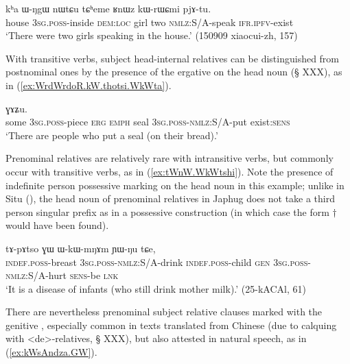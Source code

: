 \begin{exe}
\ex \label{ex:tCheme.RnWz.kWrWCmi}
 \gll  kʰa ɯ-ŋgɯ nɯtɕu tɕʰeme ʁnɯz kɯ-rɯɕmi pjɤ-tu. \\
 house \textsc{3sg}.\textsc{poss}-inside \textsc{dem}:\textsc{loc} girl two \textsc{nmlz}:S/A-speak \textsc{ifr}.\textsc{ipfv}-exist \\
\glt  `There were two girls speaking in the house.' (150909 xiaocui-zh, 157)
\end{exe}

With transitive verbs, subject head-internal relatives can be distinguished from postnominal ones  by the presence of the ergative  on the head noun (§ XXX), as in (\ref{ex:WrdWrdoR.kW.thotsi.WkWta}).

\begin{exe}
\ex \label{ex:WrdWrdoR.kW.thotsi.WkWta}
  ɣɤʑu. \\
 some \textsc{3sg}.\textsc{poss}-piece \textsc{erg} \textsc{emph} seal \textsc{3sg}.\textsc{poss}-\textsc{nmlz}:S/A-put exist:\textsc{sens} \\
 \glt `There are people who put a seal (on their bread).'
\end{exe}


Prenominal relatives are relatively rare with intransitive verbs, but commonly occur with transitive verbs, as in (\ref{ex:tWnW.WkWtshi}). Note the presence of indefinite person possessive marking on the head noun  in this example; unlike in Situ (\citealt{jacksonlin07}), the head noun of prenominal relatives in Japhug does not take a third person singular prefix as in a possessive construction (in which case the form $\dagger$ would have been found).

\begin{exe}
\ex \label{ex:tWnW.WkWtshi}
 \gll  [tɯ-nɯ ɯ-kɯ-tsʰi] tɤ-pɤtso ɣɯ ɯ-kɯ-mŋɤm ɲɯ-ŋu tɕe, \\
 \textsc{indef}.\textsc{poss}-breast \textsc{3sg}.\textsc{poss}-\textsc{nmlz}:S/A-drink \textsc{indef}.\textsc{poss}-child \textsc{gen} \textsc{3sg}.\textsc{poss}-\textsc{nmlz}:S/A-hurt \textsc{sens}-be \textsc{lnk} \\
 \glt `It is a disease of infants (who still drink mother milk).' (25-kACAl, 61)
\end{exe}

There are nevertheless prenominal subject relative clauses marked with the genitive , especially common in texts translated from Chinese (due to calquing with  <de>-relatives, § XXX), but also attested in natural speech, as in (\ref{ex:kWsAndza.GW}).

